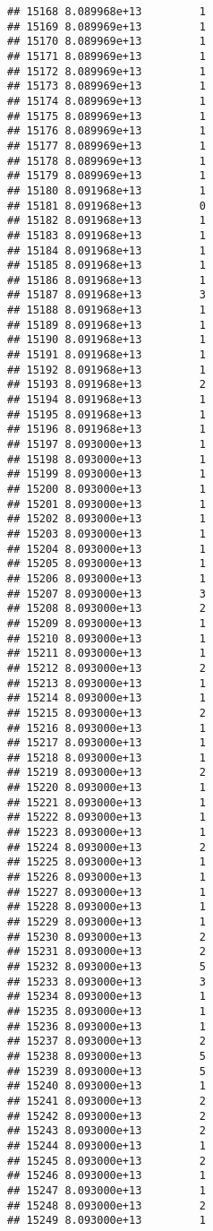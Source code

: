 \documentclass[
]{article}
\begin{document}
\begin{verbatim}
## 15168 8.089968e+13         1
## 15169 8.089969e+13         1
## 15170 8.089969e+13         1
## 15171 8.089969e+13         1
## 15172 8.089969e+13         1
## 15173 8.089969e+13         1
## 15174 8.089969e+13         1
## 15175 8.089969e+13         1
## 15176 8.089969e+13         1
## 15177 8.089969e+13         1
## 15178 8.089969e+13         1
## 15179 8.089969e+13         1
## 15180 8.091968e+13         1
## 15181 8.091968e+13         0
## 15182 8.091968e+13         1
## 15183 8.091968e+13         1
## 15184 8.091968e+13         1
## 15185 8.091968e+13         1
## 15186 8.091968e+13         1
## 15187 8.091968e+13         3
## 15188 8.091968e+13         1
## 15189 8.091968e+13         1
## 15190 8.091968e+13         1
## 15191 8.091968e+13         1
## 15192 8.091968e+13         1
## 15193 8.091968e+13         2
## 15194 8.091968e+13         1
## 15195 8.091968e+13         1
## 15196 8.091968e+13         1
## 15197 8.093000e+13         1
## 15198 8.093000e+13         1
## 15199 8.093000e+13         1
## 15200 8.093000e+13         1
## 15201 8.093000e+13         1
## 15202 8.093000e+13         1
## 15203 8.093000e+13         1
## 15204 8.093000e+13         1
## 15205 8.093000e+13         1
## 15206 8.093000e+13         1
## 15207 8.093000e+13         3
## 15208 8.093000e+13         2
## 15209 8.093000e+13         1
## 15210 8.093000e+13         1
## 15211 8.093000e+13         1
## 15212 8.093000e+13         2
## 15213 8.093000e+13         1
## 15214 8.093000e+13         1
## 15215 8.093000e+13         2
## 15216 8.093000e+13         1
## 15217 8.093000e+13         1
## 15218 8.093000e+13         1
## 15219 8.093000e+13         2
## 15220 8.093000e+13         1
## 15221 8.093000e+13         1
## 15222 8.093000e+13         1
## 15223 8.093000e+13         1
## 15224 8.093000e+13         2
## 15225 8.093000e+13         1
## 15226 8.093000e+13         1
## 15227 8.093000e+13         1
## 15228 8.093000e+13         1
## 15229 8.093000e+13         1
## 15230 8.093000e+13         2
## 15231 8.093000e+13         2
## 15232 8.093000e+13         5
## 15233 8.093000e+13         3
## 15234 8.093000e+13         1
## 15235 8.093000e+13         1
## 15236 8.093000e+13         1
## 15237 8.093000e+13         2
## 15238 8.093000e+13         5
## 15239 8.093000e+13         5
## 15240 8.093000e+13         1
## 15241 8.093000e+13         2
## 15242 8.093000e+13         2
## 15243 8.093000e+13         2
## 15244 8.093000e+13         1
## 15245 8.093000e+13         2
## 15246 8.093000e+13         1
## 15247 8.093000e+13         1
## 15248 8.093000e+13         2
## 15249 8.093000e+13         1

\end{verbatim}
\end{document}
